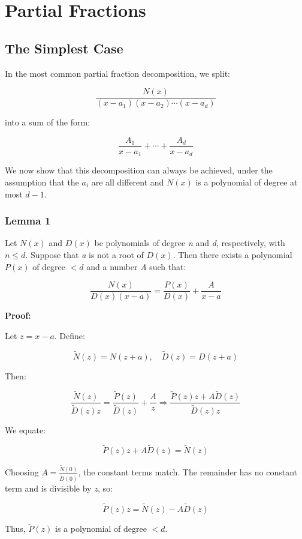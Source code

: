 \newpage
\section{Partial Fractions}

\subsection{The Simplest Case}

In the most common partial fraction decomposition, we split:

\[
    \frac{N(x)}{(x - a_1)(x - a_2)\cdots(x - a_d)}
\]

into a sum of the form:

\[
    \frac{A_1}{x - a_1} + \cdots + \frac{A_d}{x - a_d}
\]

We now show that this decomposition can always be achieved, under the assumption that the \(a_i\) are 
all different and \(N(x)\) is a polynomial of degree at most \(d - 1\).

\subsubsection{Lemma 1}

Let \(N(x)\) and \(D(x)\) be polynomials of degree \emph{n} and \emph{d}, respectively, with \(n \leq d\). 
Suppose that \emph{a} is not a root of \(D(x)\). Then there exists a polynomial \(P(x)\) of degree \(< d\) 
and a number \emph{A} such that:

\[
    \frac{N(x)}{D(x)(x - a)} = \frac{P(x)}{D(x)} + \frac{A}{x - a}
\]

\textbf{Proof:} 

Let \(z = x - a\). Define:

\[
    \tilde{N}(z) = N(z + a), \quad \tilde{D}(z) = D(z + a)
\]

Then:

\[
    \frac{\tilde{N}(z)}{\tilde{D}(z)z} = \frac{\tilde{P}(z)}{\tilde{D}(z)} + \frac{A}{z}
    \Rightarrow \frac{\tilde{P}(z)z + A\tilde{D}(z)}{\tilde{D}(z)z}
\]

We equate:

\[
    \tilde{P}(z)z + A\tilde{D}(z) = \tilde{N}(z)
\]

Choosing \(A = \frac{\tilde{N}(0)}{\tilde{D}(0)}\), the constant terms match. The remainder has no 
constant term and is divisible by \emph{z}, so:

\[
    \tilde{P}(z)z = \tilde{N}(z) - A\tilde{D}(z)
\]

Thus, \(\tilde{P}(z)\) is a polynomial of degree \(< d\).

